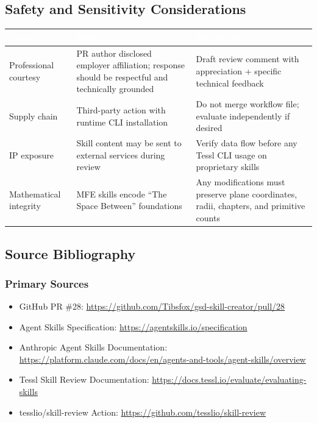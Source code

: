 \documentclass[11pt,letterpaper]{article}
\newcommand{\tableheader}[1]{\textbf{\sffamily\textcolor{white}{#1}}}
\begin{document}
\subsection{Safety and Sensitivity Considerations}

\begin{center}
\begin{tabularx}{\textwidth}{L{3cm}XL{2.5cm}}
\toprule
{}
\tableheader{Concern} & \tableheader{Details} & \tableheader{Mitigation} \\
\midrule
Professional courtesy & PR author disclosed employer affiliation; response should be respectful and technically grounded & Draft review comment with appreciation + specific technical feedback \\
Supply chain & Third-party action with runtime CLI installation & Do not merge workflow file; evaluate independently if desired \\
IP exposure & Skill content may be sent to external services during review & Verify data flow before any Tessl CLI usage on proprietary skills \\
Mathematical integrity & MFE skills encode ``The Space Between'' foundations & Any modifications must preserve plane coordinates, radii, chapters, and primitive counts \\
\bottomrule
\end{tabularx}
\end{center}

\subsection{Source Bibliography}

\subsubsection{Primary Sources}

\begin{itemize}[leftmargin=2em]
\item GitHub PR \#28: \url{https://github.com/Tibsfox/gsd-skill-creator/pull/28}
\item Agent Skills Specification: \url{https://agentskills.io/specification}
\item Anthropic Agent Skills Documentation: \url{https://platform.claude.com/docs/en/agents-and-tools/agent-skills/overview}
\item Tessl Skill Review Documentation: \url{https://docs.tessl.io/evaluate/evaluating-skills}
\item tesslio/skill-review Action: \url{https://github.com/tesslio/skill-review}
\end{itemize}
\end{document}
